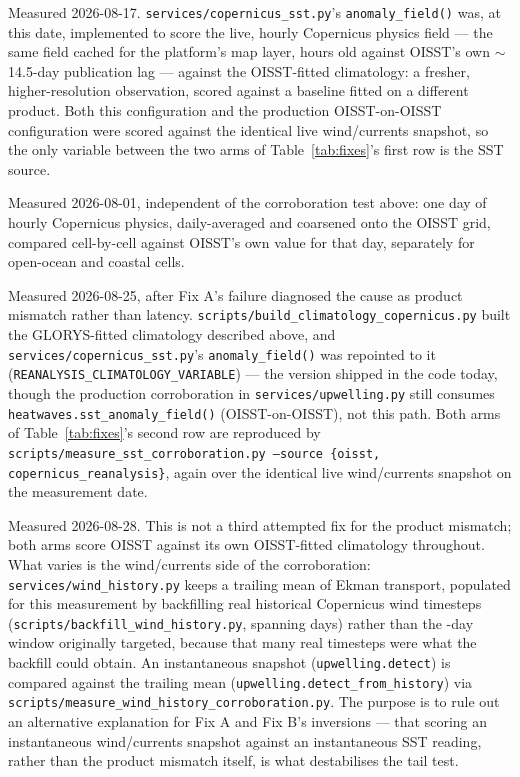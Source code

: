 {\raggedright\sloppy
{} Measured 2026-08-17.
\texttt{services/copernicus\_sst.py}'s \texttt{anomaly\_field()} was, at this
date, implemented to score the live, hourly Copernicus physics field --- the
same field cached for the platform's map layer, hours old against OISST's
own \(\sim\)14.5-day publication lag --- against the OISST-fitted
climatology: a fresher, higher-resolution observation, scored against a
baseline fitted on a different product. Both this configuration and the
production OISST-on-OISST configuration were scored against the identical
live wind/currents snapshot, so the only variable between the two arms of
Table~\ref{tab:fixes}'s first row is the SST source.\par}

 Measured 2026-08-01, independent
of the corroboration test above: one day of hourly Copernicus physics,
daily-averaged and coarsened onto the OISST grid, compared cell-by-cell
against OISST's own value for that day, separately for open-ocean and coastal
cells.

{\raggedright\sloppy
{}
Measured 2026-08-25, after Fix A's failure diagnosed the cause as product
mismatch rather than latency. \texttt{scripts/build\_climatology\_copernicus.py}
built the GLORYS-fitted climatology described above, and
\texttt{services/copernicus\_sst.py}'s \texttt{anomaly\_field()} was
repointed to it (\texttt{REANALYSIS\_CLIMATOLOGY\_VARIABLE}) --- the version
shipped in the code today, though the production corroboration in
\texttt{services/upwelling.py} still consumes
\texttt{heatwaves.sst\_anomaly\_field()} (OISST-on-OISST), not this path.
Both arms of Table~\ref{tab:fixes}'s second row are reproduced by
\texttt{scripts/measure\_sst\_corroboration.py --source \{oisst,
copernicus\_reanalysis\}}, again over the identical live wind/currents
snapshot on the measurement date.\par}

{\raggedright\sloppy
{}
Measured 2026-08-28. This is not a third attempted fix for the product
mismatch; both arms score OISST against its own OISST-fitted climatology
throughout. What varies is the wind/currents side of the corroboration:
\texttt{services/wind\_history.py} keeps a trailing mean of Ekman transport,
populated for this measurement by backfilling \WindHistoryTimesteps{} real
historical Copernicus wind timesteps
(\texttt{scripts/backfill\_wind\_history.py}, spanning
\WindHistoryWindowDays{} days) rather than the
\WindHistoryTargetWindowDays{}-day window originally targeted, because that
many real timesteps were what the backfill could obtain. An instantaneous
snapshot (\texttt{upwelling.detect}) is compared against the trailing mean
(\texttt{upwelling.detect\_from\_history}) via
\texttt{scripts/measure\_wind\_history\_corroboration.py}. The purpose is to
rule out an alternative explanation for Fix A and Fix B's inversions ---
that scoring an instantaneous wind/currents snapshot against an instantaneous
SST reading, rather than the product mismatch itself, is what destabilises
the tail test.\par}

